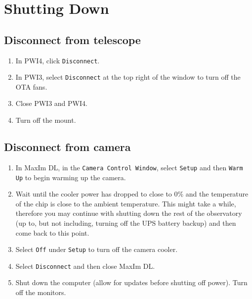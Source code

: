 \documentclass{article}
\begin{document}
	\newpage
	\section{Shutting Down}
	
	\subsection{Disconnect from telescope}
		
		\begin{enumerate}
					
			\item In PWI4, click \texttt{Disconnect}.
			
			\item In PWI3, select \texttt{Disconnect} at the top right of the window to turn off the OTA fans.
			
			\item Close PWI3 and PWI4.
			
			\item Turn off the mount.
			
		\end{enumerate}
		
	\subsection{Disconnect from camera}
		
		\begin{enumerate}
			
			\item In MaxIm DL, in the \texttt{Camera Control Window}, select \texttt{Setup} and then \texttt{Warm Up} to begin warming up the camera.
			
			\item Wait until the cooler power has dropped to close to 0\% and the temperature of the chip is close to the ambient temperature. This might take a while, therefore you may continue with shutting down the rest of the observatory (up to, but not including, turning off the UPS battery backup) and then come back to this point.
			
			\item Select \texttt{Off} under \texttt{Setup} to turn off the camera cooler.
			
			\item Select \texttt{Disconnect} and then close MaxIm DL.
			
			\item Shut down the computer (allow for updates before shutting off power). Turn off the monitors.
			
		\end{enumerate}
		
\end{document}
